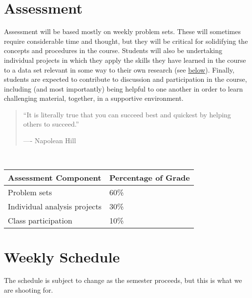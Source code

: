 \documentclass[]{book}
\begin{document}
\hypertarget{assessment}{%
\section*{Assessment}\label{assessment}}

Assessment will be based mostly on weekly problem sets. These will sometimes require
considerable time and thought, but they will be critical for solidifying the concepts
and procedures in the course. Students will also be undertaking individual projects
in which they apply the skills they have learned in the course to a data set
relevant in some way to their own research (see \protect\hyperlink{indproj}{below}).
Finally, students are expected to contribute to discussion and participation in the course,
including (and most importantly) being helpful to one another in order to learn challenging material,
together, in a supportive environment.

\begin{quote}
``It is literally true that you can succeed best
and quickest by helping others to succeed.''

\hfill ---- Napolean Hill
\end{quote}

~

\begin{longtable}[]{@{}ll@{}}
\toprule
Assessment Component & Percentage of Grade\tabularnewline
\midrule
\endhead
Problem sets & 60\%\tabularnewline
Individual analysis projects & 30\%\tabularnewline
Class participation & 10\%\tabularnewline
\bottomrule
\end{longtable}

\hypertarget{weekly-schedule}{%
\section*{Weekly Schedule}\label{weekly-schedule}}

The schedule is subject to change as the semester proceeds, but this
is what we are shooting for.
\end{document}
